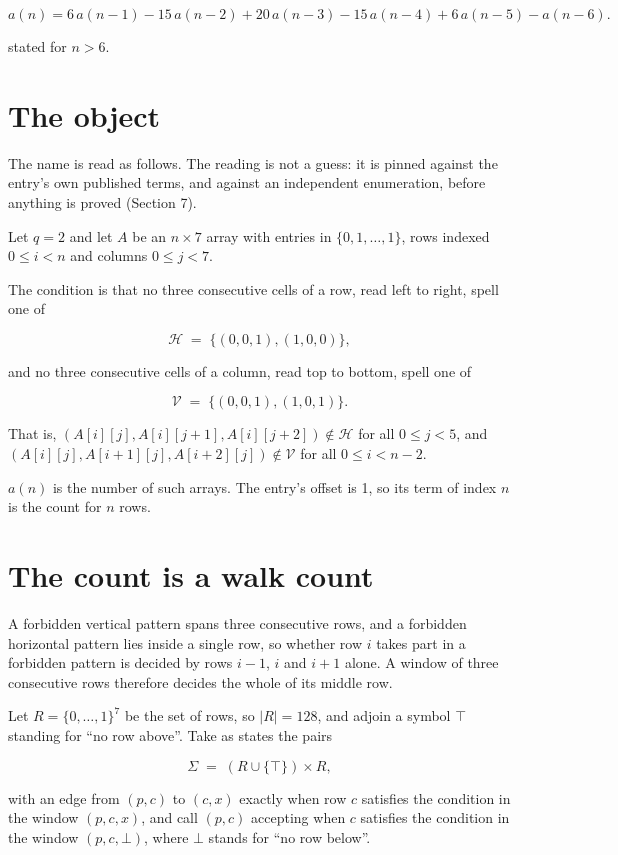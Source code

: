 \documentclass[11pt]{article}
\theoremstyle{definition}
\begin{document}
\[a(n) = 6\,a(n-1) - 15\,a(n-2) + 20\,a(n-3) - 15\,a(n-4) + 6\,a(n-5) - a(n-6).\]

stated for $n > 6$.

\section{The object}

The name is read as follows. The reading is not a guess: it is pinned against the entry's own published terms, and against an independent enumeration, before anything is proved (Section 7).

Let $q = 2$ and let $A$ be an $n \times 7$ array with entries in $\{0,1,\dots,1\}$, rows indexed $0 \le i < n$ and columns $0 \le j < 7$.

The condition is that no three consecutive cells of a row, read left to right, spell one of

\[\mathcal{H} \;=\; \{(0,0,1), (1,0,0)\},\]

and no three consecutive cells of a column, read top to bottom, spell one of

\[\mathcal{V} \;=\; \{(0,0,1), (1,0,1)\}.\]

That is, $(A[i][j],A[i][j{+}1],A[i][j{+}2]) \notin \mathcal{H}$ for all $0 \le j < 5$, and $(A[i][j],A[i{+}1][j],A[i{+}2][j]) \notin \mathcal{V}$ for all $0 \le i < n-2$.

$a(n)$ is the number of such arrays. The entry's offset is 1, so its term of index $n$ is the count for $n$ rows.

\section{The count is a walk count}

A forbidden vertical pattern spans three consecutive rows, and a forbidden horizontal pattern lies inside a single row, so whether row $i$ takes part in a forbidden pattern is decided by rows $i-1$, $i$ and $i+1$ alone. A window of three consecutive rows therefore decides the whole of its middle row.

Let $R = \{0,\dots,1\}^{7}$ be the set of rows, so $|R| = 128$, and adjoin a symbol $\top$ standing for ``no row above''. Take as states the pairs

\[\Sigma \;=\; (R \cup \{\top\}) \times R,\]

with an edge from $(p,c)$ to $(c,x)$ exactly when row $c$ satisfies the condition in the window $(p,c,x)$, and call $(p,c)$ accepting when $c$ satisfies the condition in the window $(p,c,\bot)$, where $\bot$ stands for ``no row below''.
\end{document}
